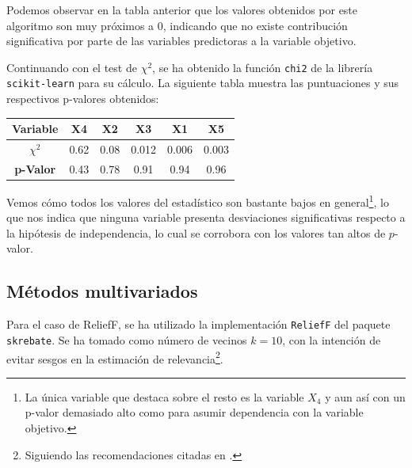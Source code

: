 \documentclass[a4paper,12pt]{article}
\begin{document}
Podemos observar en la tabla anterior que los valores obtenidos por este algoritmo son muy próximos a 0, indicando que no existe contribución significativa por parte de las variables predictoras a la variable objetivo. %


Continuando con el test de \(\chi^2\), se ha obtenido la función \texttt{chi2} de la librería \texttt{scikit-learn} para su cálculo. La siguiente tabla muestra las puntuaciones y sus respectivos p-valores obtenidos:

\begin{table}[h]
    \centering
    \begin{tabular}{|c|c|c|c|c|c|}
        \hline
        \textbf{Variable}   & \textbf{X4} & \textbf{X2} & \textbf{X3} & \textbf{X1} & \textbf{X5} \\
        \hline
        \textbf{\(\chi^2\)} & 0.62        & 0.08        & 0.012       & 0.006       & 0.003       \\
        \hline
        \textbf{p-Valor}    & 0.43        & 0.78        & 0.91        & 0.94        & 0.96        \\
        \hline
    \end{tabular}
    \label{tab:chi2}
\end{table}

Vemos cómo todos los valores del estadístico son bastante bajos en general\footnote{La única variable que destaca sobre el resto es la variable \(X_4\) y aun así con un p-valor demasiado alto como para asumir dependencia con la variable objetivo.}, lo que nos indica que ninguna variable presenta desviaciones significativas respecto a la hipótesis de independencia, lo cual se corrobora con los valores tan altos de $p$-valor. %


\subsection{Métodos multivariados}

Para el caso de ReliefF, se ha utilizado la implementación \texttt{ReliefF} del paquete \texttt{skrebate}. Se ha tomado como número de vecinos $k=10$, con la intención de evitar sesgos en la estimación de relevancia\footnote{Siguiendo las recomendaciones citadas en \cite{liu2012,urbanowicz2018}.}.
\end{document}
